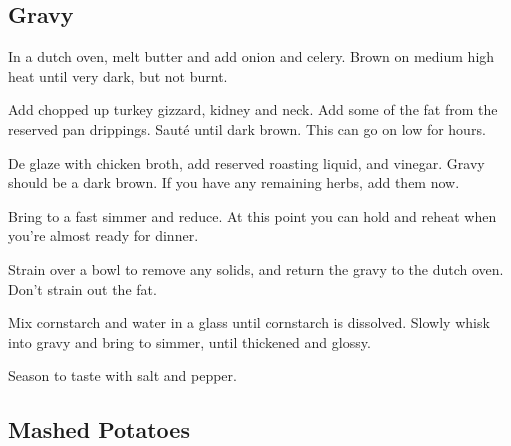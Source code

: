 \begin{recipe}
\subsection{Gravy}



In a dutch oven, melt butter and add onion and celery. Brown on medium high heat until very dark, but not burnt.

Add chopped up turkey gizzard, kidney and neck. Add some of the fat from the reserved pan drippings. Sauté until dark brown. This can go on low for hours.


De glaze with chicken broth, add reserved roasting liquid, and vinegar. Gravy should be a dark brown. If you have any remaining herbs, add them now.

Bring to a fast simmer and reduce. At this point you can hold and reheat when you're almost ready for dinner.

Strain over a bowl to remove any solids, and return the gravy to the dutch oven. Don't strain out the fat. 


Mix cornstarch and water in a glass until cornstarch is dissolved. Slowly whisk into gravy and bring to simmer, until thickened and glossy. 

Season to taste with salt and pepper.

\subsection{Mashed Potatoes}


\end{recipe}
